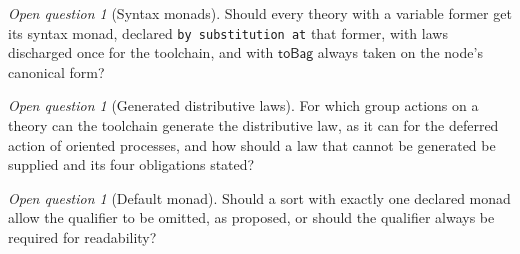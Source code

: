 \documentclass[11pt]{article}
\theoremstyle{definition}
\theoremstyle{plain}
\theoremstyle{remark}
\newtheorem{question}[definition]{Open question}
\begin{document}
\begin{question}[Syntax monads]
Should every theory with a variable former get its syntax monad, declared
\texttt{by substitution at} that former, with laws discharged once for the
toolchain, and with \(\mathsf{toBag}\) always taken on the node's canonical
form?
\end{question}

\begin{question}[Generated distributive laws]
For which group actions on a theory can the toolchain generate the
distributive law, as it can for the deferred action of oriented processes, and
how should a law that cannot be generated be supplied and its four obligations
stated?
\end{question}

\begin{question}[Default monad]
Should a sort with exactly one declared monad allow the qualifier to be omitted,
as proposed, or should the qualifier always be required for readability?
\end{question}
\end{document}
